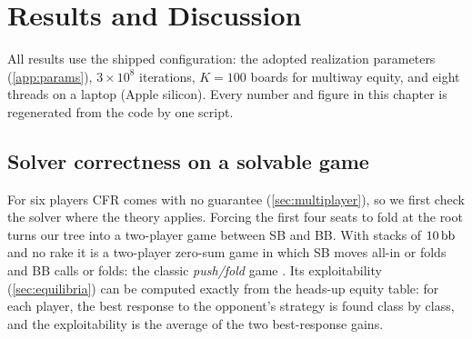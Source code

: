 \chapter{Results and Discussion}\label{ch:results}



\newcommand{\gridpair}[2]{%
  \def\gridunit{0.5cm}%
  \begin{subfigure}[t]{0.48\linewidth}\centering
    
    \caption*{\footnotesize Scratch: #2 \hfill $D = \spotdist{gto}{#1}$}
  \end{subfigure}\hfill
  \begin{subfigure}[t]{0.48\linewidth}\centering
    
    \caption*{\footnotesize GTO chart \cite{pokertrainer}: #2}
  \end{subfigure}}

All results use the shipped configuration: the adopted realization parameters (\cref{app:params}), $3\times 10^8$ iterations, $K = 100$ boards for multiway equity, and eight threads on a laptop (Apple silicon). Every number and figure in this chapter is regenerated from the code by one script.

\section{Solver correctness on a solvable game}\label{sec:res-pushfold}

For six players CFR comes with no guarantee (\cref{sec:multiplayer}), so we first check the solver where the theory applies. Forcing the first four seats to fold at the root turns our tree into a two-player game between SB and BB. With stacks of $10\,\mathrm{bb}$ and no rake it is a two-player zero-sum game in which SB moves all-in or folds and BB calls or folds: the classic \emph{push/fold} game \cite{ganzfried2008}. Its exploitability (\cref{sec:equilibria}) can be computed exactly from the heads-up equity table: for each player, the best response to the opponent's strategy is found class by class, and the exploitability is the average of the two best-response gains.

